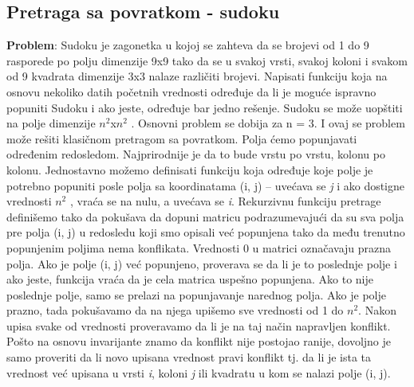 \documentclass{article}
\begin{document}
\subsection{Pretraga sa povratkom - sudoku}
\textbf{Problem}: Sudoku je zagonetka u kojoj se zahteva da se brojevi od 1 do 9
rasporede po polju dimenzije 9x9 tako da se u svakoj vrsti, svakoj koloni i
svakom od 9 kvadrata dimenzije 3x3 nalaze različiti brojevi. Napisati funkciju
koja na osnovu nekoliko datih početnih vrednosti određuje da li je moguće
ispravno popuniti Sudoku i ako jeste, određuje bar jedno rešenje.
\newline
Sudoku se može uopštiti na polje dimenzije $n^2$x$n^2$ . Osnovni problem se dobija
za n = 3. I ovaj se problem može rešiti klasičnom pretragom sa povratkom. Polja
ćemo popunjavati određenim redosledom. Najprirodnije je da to bude vrstu po
vrstu, kolonu po kolonu. Jednostavno možemo definisati funkciju koja određuje
koje polje je potrebno popuniti posle polja sa koordinatama (i, j) – uvećava se \textit{j}
i ako dostigne vrednosti $n^2$ , vraća se na nulu, a uvećava se \textit{i}.
\newline
Rekurzivnu funkciju pretrage definišemo tako da pokušava da dopuni matricu
podrazumevajući da su sva polja pre polja (i, j) u redosledu koji smo opisali već
popunjena tako da među trenutno popunjenim poljima nema konflikata. Vrednosti 0 u matrici označavaju
prazna polja. Ako je polje (i, j) već popunjeno, proverava se da li je to poslednje
polje i ako jeste, funkcija vraća da je cela matrica uspešno popunjena.
Ako to nije poslednje polje, samo se prelazi na popunjavanje narednog polja. Ako
je polje prazno, tada pokušavamo da na njega upišemo sve vrednosti od 
1 do $n^2$.
Nakon upisa svake od vrednosti proveravamo da li je na taj način napravljen
konflikt. Pošto na osnovu invarijante znamo da konflikt nije postojao ranije,
dovoljno je samo proveriti da li novo upisana vrednost pravi konflikt tj. da li je
ista ta vrednost već upisana u vrsti \textit{i}, koloni \textit{j} ili kvadratu u kom se nalazi polje (i, j).
\end{document}
